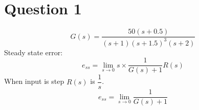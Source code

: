 \section[]{Question 1}
$$
G(s) = \dfrac{50(s+0.5)}{(s+1)(s+1.5)^{3}(s+2)}
$$
Steady state error:
$$
e_{ss} = \lim_{s \to 0} s \times \dfrac{1}{G(s) + 1}R(s)
$$
When input is step $R(s)$ is $\dfrac{1}{s}$.
$$
e_{ss} = \lim_{s \to 0}  \dfrac{1}{G(s) + 1} 
$$